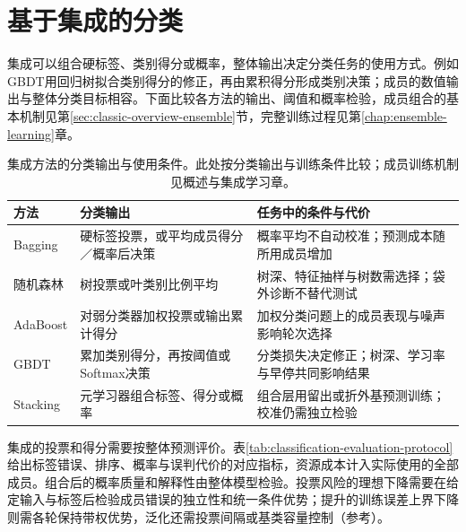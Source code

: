 \section{基于集成的分类}
\label{sec:classification-ensemble}

集成可以组合硬标签、类别得分或概率，整体输出决定分类任务的使用方式。例如GBDT用回归树拟合类别得分的修正，再由累积得分形成类别决策；成员的数值输出与整体分类目标相容。下面比较各方法的输出、阈值和概率检验，成员组合的基本机制见第\ref{sec:classic-overview-ensemble}节，完整训练过程见第\ref{chap:ensemble-learning}章。

\begin{table}[htbp]
  \centering
  \small
  \begin{tabularx}{\linewidth}{@{}>{\RaggedRight\arraybackslash}p{22mm}>{\RaggedRight\arraybackslash}X>{\RaggedRight\arraybackslash}X@{}}
    \toprule
    方法 & 分类输出 & 任务中的条件与代价 \\
    \midrule
    Bagging & 硬标签投票，或平均成员得分／概率后决策 & 概率平均不自动校准；预测成本随所用成员增加 \\
    随机森林 & 树投票或叶类别比例平均 & 树深、特征抽样与树数需选择；袋外诊断不替代测试 \\
    AdaBoost & 对弱分类器加权投票或输出累计得分 & 加权分类问题上的成员表现与噪声影响轮次选择 \\
    GBDT & 累加类别得分，再按阈值或Softmax决策 & 分类损失决定修正；树深、学习率与早停共同影响结果 \\
    Stacking & 元学习器组合标签、得分或概率 & 组合层用留出或折外基预测训练；校准仍需独立检验 \\
    \bottomrule
  \end{tabularx}
  \caption{集成方法的分类输出与使用条件。此处按分类输出与训练条件比较；成员训练机制见概述与集成学习章。}
  \label{tab:classification-ensemble-map}
\end{table}

集成的投票和得分需要按整体预测评价。表\ref{tab:classification-evaluation-protocol}给出标签错误、排序、概率与误判代价的对应指标，资源成本计入实际使用的全部成员。组合后的概率质量和解释性由整体模型检验。投票风险的理想下降需要在给定输入与标签后检验成员错误的独立性和统一条件优势；提升的训练误差上界下降则需各轮保持带权优势，泛化还需投票间隔或基类容量控制（参考）。
